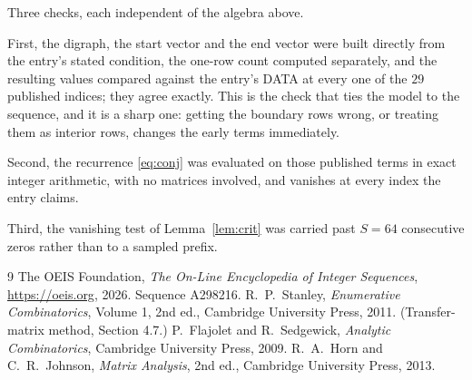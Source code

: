 \documentclass[11pt,a4paper]{article}
\theoremstyle{plain}
\theoremstyle{definition}
\begin{document}
Three checks, each independent of the algebra above.

First, the digraph, the start vector and the end vector were built directly from the
entry's stated condition, the one-row count computed separately, and the resulting values
compared against the entry's DATA at every one of the $29$ published indices; they
agree exactly. This is the check that ties the model to the sequence, and it is a sharp one:
getting the boundary rows wrong, or treating them as interior rows, changes the early terms
immediately.

Second, the recurrence \eqref{eq:conj} was evaluated on those published terms in exact
integer arithmetic, with no matrices involved, and vanishes at every index the entry claims.

Third, the vanishing test of Lemma~\ref{lem:crit} was carried past $S=64$ consecutive
zeros rather than to a sampled prefix.

\begin{thebibliography}{9}
 The OEIS Foundation, \emph{The On-Line Encyclopedia of Integer
Sequences}, \url{https://oeis.org}, 2026. Sequence A298216.
 R.~P.~Stanley, \emph{Enumerative Combinatorics}, Volume 1, 2nd ed.,
Cambridge University Press, 2011. (Transfer-matrix method, Section 4.7.)
 P.~Flajolet and R.~Sedgewick, \emph{Analytic Combinatorics}, Cambridge
University Press, 2009.
 R.~A.~Horn and C.~R.~Johnson, \emph{Matrix Analysis}, 2nd ed., Cambridge
University Press, 2013.
\end{thebibliography}
\end{document}
